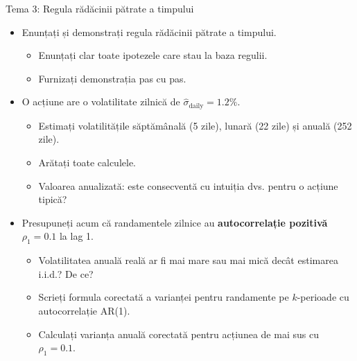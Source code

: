 \documentclass[9pt, aspectratio=169, t]{beamer}
\theoremstyle{definition}
\begin{document}
\begin{frame}{Tema 3: Regula rădăcinii pătrate a timpului}
\begin{itemize}
    \item Enunțați și demonstrați regula rădăcinii pătrate a timpului.
    \begin{itemize}
        \item Enunțați clar toate ipotezele care stau la baza regulii.
        \item Furnizați demonstrația pas cu pas.
    \end{itemize}
    \item O acțiune are o volatilitate zilnică de $\hat{\sigma}_{\text{daily}} = 1.2\%$.
    \begin{itemize}
        \item Estimați volatilitățile săptămânală (5 zile), lunară (22 zile) și anuală (252 zile).
        \item Arătați toate calculele.
        \item Valoarea anualizată: este consecventă cu intuiția dvs. pentru o acțiune tipică?
    \end{itemize}
    \item Presupuneți acum că randamentele zilnice au \textbf{autocorrelație pozitivă} $\rho_1 = 0.1$ la lag 1.
    \begin{itemize}
        \item Volatilitatea anuală reală ar fi mai mare sau mai mică decât estimarea i.i.d.? De ce?
        \item Scrieți formula corectată a varianței pentru randamente pe $k$-perioade cu autocorrelație AR(1).
        \item Calculați varianța anuală corectată pentru acțiunea de mai sus cu $\rho_1 = 0.1$.
    \end{itemize}
\end{itemize}
\end{frame}
\end{document}
